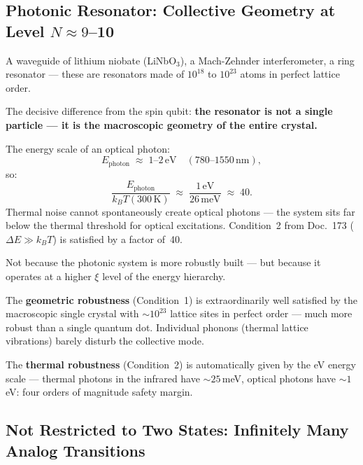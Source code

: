 \subsection{Photonic Resonator: Collective Geometry at Level
  \texorpdfstring{$N \approx 9$--10}{N≈9-10}}

A waveguide of lithium niobate (LiNbO$_3$),
a Mach-Zehnder interferometer, a ring resonator ---
these are resonators made of $10^{18}$ to $10^{23}$ atoms
in perfect lattice order.

The decisive difference from the spin qubit:
\textbf{the resonator is not a single particle ---
it is the macroscopic geometry of the entire crystal.}

The energy scale of an optical photon:
\begin{equation}
  E_\text{photon} \;\approx\; 1\text{--}2\,\text{eV}
  \quad (780\text{--}1550\,\text{nm}),
\end{equation}
so:
\begin{equation}
  \frac{E_\text{photon}}{k_BT(300\,\text{K})}
  \;\approx\; \frac{1\,\text{eV}}{26\,\text{meV}}
  \;\approx\; 40.
\end{equation}
Thermal noise cannot spontaneously create optical
photons --- the system sits far below
the thermal threshold for optical excitations.
Condition~2 from Doc.~173 ($\Delta E \gg k_BT$)
is satisfied by a factor of~40.

\begin{important}
Not because the photonic system is more robustly built ---
but because it operates at a higher $\xi$ level
of the energy hierarchy.

The \textbf{geometric robustness} (Condition~1)
is extraordinarily well satisfied by the macroscopic
single crystal with $\sim 10^{23}$ lattice sites in perfect order ---
much more robust than a single quantum dot.
Individual phonons (thermal lattice vibrations)
barely disturb the collective mode.

The \textbf{thermal robustness} (Condition~2)
is automatically given by the eV energy scale ---
thermal photons in the infrared have $\sim 25$\,meV,
optical photons have $\sim 1$\,eV:
four orders of magnitude safety margin.
\end{important}

\subsection{Not Restricted to Two States:
  Infinitely Many Analog Transitions}

